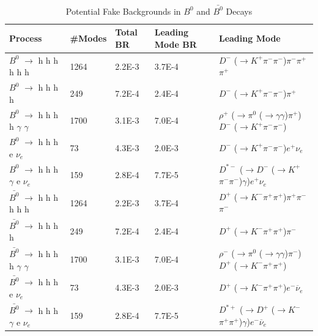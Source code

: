 \begin{table}[!ht]
    \small
    \begin{tabular}{|| l | l | l | l | l ||}
        \hline
        {\textbf {Process}} & {\textbf {\#Modes}} & {\textbf {Total BR}} & {\textbf {Leading Mode BR}} & {\textbf {Leading Mode}}\\
        \hline
        $B^0$ $\to$ h h h h h h & 1264 & 2.2E-3 & 3.7E-4 & $D^-$ ($\rightarrow$$K^+$$\pi^-$$\pi^-$)$\pi^-$$\pi^+$$\pi^+$  \\
        $B^0$ $\to$ h h h h & 249 & 7.2E-4 & 2.4E-4 & $D^-$ ($\rightarrow$$K^+$$\pi^-$$\pi^-$)$\pi^+$  \\
        $B^0$ $\to$ h h h h $\gamma$ $\gamma$ & 1700 & 3.1E-3 & 7.0E-4 & $\rho^+$ ($\rightarrow$$\pi^0$ ($\rightarrow$$\gamma$$\gamma$)$\pi^+$)$D^-$ ($\rightarrow$$K^+$$\pi^-$$\pi^-$) \\
        $B^0$ $\to$ h h h e $\nu_e$ & 73 & 4.3E-3 & 2.0E-3 & $D^-$ ($\rightarrow$$K^+$$\pi^-$$\pi^-$)$e^+$$\nu_e$  \\
        $B^0$ $\to$ h h h $\gamma$ e $\nu_e$ & 159 & 2.8E-4 & 7.7E-5 & $D^{*-}$ ($\rightarrow$$D^-$ ($\rightarrow$$K^+$$\pi^-$$\pi^-$)$\gamma$)$e^+$$\nu_e$  \\
        $\bar{B^0}$ $\to$ h h h h h h & 1264 & 2.2E-3 & 3.7E-4 & $D^+$ ($\rightarrow$$K^-$$\pi^+$$\pi^+$)$\pi^+$$\pi^-$$\pi^-$  \\
        $\bar{B^0}$ $\to$ h h h h & 249 & 7.2E-4 & 2.4E-4 & $D^+$ ($\rightarrow$$K^-$$\pi^+$$\pi^+$)$\pi^-$  \\
        $\bar{B^0}$ $\to$ h h h h  $\gamma$ $\gamma$ & 1700 & 3.1E-3 & 7.0E-4 & $\rho^-$ ($\rightarrow$$\pi^0$ ($\rightarrow$$\gamma$$\gamma$)$\pi^-$)$D^+$ ($\rightarrow$$K^-$$\pi^+$$\pi^+$) \\
        $\bar{B^0}$ $\to$ h h h e $\nu_e$ & 73 & 4.3E-3 & 2.0E-3 & $D^+$ ($\rightarrow$$K^-$$\pi^+$$\pi^+$)$e^-$$\overline{\nu}_e$  \\
        $\bar{B^0}$ $\to$ h h h $\gamma$ e $\nu_e$ & 159 & 2.8E-4 & 7.7E-5 & $D^{*+}$ ($\rightarrow$$D^+$ ($\rightarrow$$K^-$$\pi^+$$\pi^+$)$\gamma$)$e^-$$\overline{\nu}_e$                  \\
        \hline
    \end{tabular} 
    \caption{Potential Fake Backgrounds in $B^0$ and $\bar{B^0}$ Decays}
    \label{tab:potential-fake-backgrounds-b0}
\end{table}
